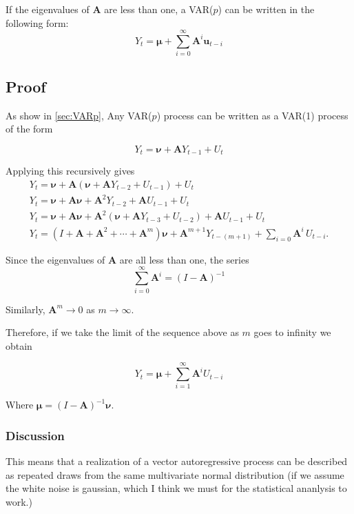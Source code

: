 \documentclass{article}
\begin{document}
            If the eigenvalues of $\bm{A}$ are less than one, a 
            VAR($p$) can be written in the following form:
            \[
                Y_t = \bm{\mu} + \sum_{i=0}^\infty \bm{A}^i\bm{u}_{t-i}
            \]

            \subsection{Proof}

            As show in \ref{sec:VARp}, Any VAR($p$) process can be written
            as a VAR(1) process of the form

            \[ 
                Y_t = \bm{\nu} + \bm{A} Y_{t - 1} + U_t
            \]

            Applying this recursively gives
            \begin{align}
                Y_t = \bm{\nu} + \bm{A}(\bm{\nu} + \bm{A} Y_{t-2} + U_{t-1}) + U_t \\
                Y_t = \bm{\nu} + \bm{A}\bm{\nu} + \bm{A}^2 Y_{t-2} + \bm{A} U_{t-1} + U_t \\
                Y_t = \bm{\nu} + \bm{A}\bm{\nu} + \bm{A}^2 (\bm{\nu} + \bm{A}Y_{t-3} + U_{t-2}) + \bm{A} U_{t-1} + U_t \\
                Y_t = (I + \bm{A} + \bm{A}^2 + \cdots + \bm{A}^m) \bm{\nu} + \bm{A}^{m+1} Y_{t - (m+1)} + \sum_{i = 0} \bm{A}^i \, U_{t - i}.
            \end{align}

            Since the eigenvalues of $\bm{A}$ are all less than one, the series 
            \[ 
                \sum_{i=0}^\infty \bm{A}^i = (I - \bm{A})^{-1} 
            \]

            Similarly, $\bm{A}^m \rightarrow 0$ as $m \rightarrow \infty$.

            Therefore, if we take the limit of the sequence above as $m$
            goes to infinity we obtain

            \[
                Y_t = \bm{\mu} + \sum_{i=1}^{\infty}\bm{A}^i U_{t-i}
            \]

            Where $\bm{\mu} = (I - \bm{A})^{-1} \bm{\nu}$.

        \subsubsection{Discussion}

        This means that a realization of a vector autoregressive
        process can be described as repeated draws from the same
        multivariate normal distribution (if we assume the white noise
        is gaussian, which I think we must for the statistical ananlysis
        to work.)
\end{document}
